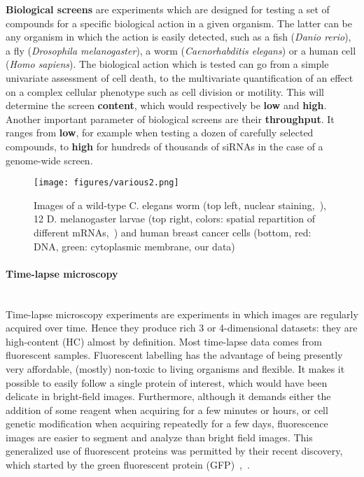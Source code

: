\textbf{Biological screens} are experiments which are designed for testing a set of compounds for a specific biological action in a given organism. The latter can be any organism in which the action is easily detected, such as a fish (\textit{Danio rerio}), a fly (\textit{Drosophila melanogaster}), a worm (\textit{Caenorhabditis elegans}) or a human cell (\textit{Homo sapiens}). The biological action which is tested can go from a simple univariate assessment of cell death, to the multivariate quantification of an effect on a complex cellular phenotype such as cell division or motility. This will determine the screen \textbf{content}, which would respectively be \textbf{low} and \textbf{high}. Another important parameter of biological screens are their \textbf{throughput}. It ranges from \textbf{low}, for example when testing a dozen of carefully selected compounds, to \textbf{high} for hundreds of thousands of siRNAs in the case of a genome-wide screen. 
\begin{figure*}[ht]
\centerline{\texttt{[image: figures/various2.png]}}
\caption{Images of a wild-type C. elegans worm (top left, nuclear staining,~\cite{plos_elegans}), 12 D. melanogaster larvae (top right, colors: spatial repartition of different mRNAs,~\cite{pmid17923096}) and human breast cancer cells (bottom, red: DNA, green: cytoplasmic membrane, our data)}
\label{image_examples}
\end{figure*}  
\paragraph*{Time-lapse microscopy}~\\
Time-lapse microscopy experiments are experiments in which images are regularly acquired over time. Hence they produce rich 3 or 4-dimensional datasets: they are high-content (HC) almost by definition. Most time-lapse data comes from fluorescent samples. Fluorescent labelling has the advantage of being presently very affordable, (mostly) non-toxic to living organisms and flexible. It makes it possible to easily follow a single protein of interest, which would have been delicate in bright-field images. Furthermore, although it demands either the addition of some reagent when acquiring for a few minutes or hours, or cell genetic modification when acquiring repeatedly for a few days, fluorescence images are easier to segment and analyze than bright field images. This generalized use of fluorescent proteins was permitted by their recent discovery, which started by the green fluorescent protein (GFP)~\cite{pmid8303295},~\cite{pmid19575655}.

